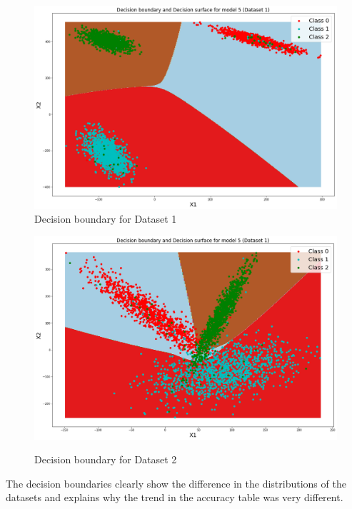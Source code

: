 \documentclass[a4 paper]{article}
\begin{document}
\begin{figure}[!htb]
    \centering
    \begin{minipage}{0.50\textwidth}
        \centering
        \includegraphics[width=1\textwidth]{decision_boundary1.png} \\
        \caption{Decision boundary for Dataset 1}
    \end{minipage}\hfill
    \begin{minipage}{0.50\textwidth}
        \centering
        \includegraphics[width=1\textwidth]{decision_boundary2.png}\\
        \caption{Decision boundary for Dataset 2}
    \end{minipage}
    \label{fig:l}
\end{figure}

The decision boundaries clearly show the difference in the distributions of the datasets and explains why the trend in the accuracy table was very different. \\
\end{document}
